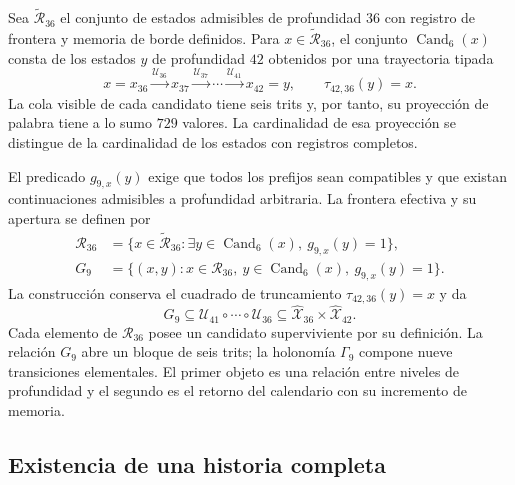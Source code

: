 Sea $\widetilde{\mathcal R}_{36}$ el conjunto de estados admisibles de
profundidad $36$ con registro de frontera y memoria de borde definidos.
Para $x\in\widetilde{\mathcal R}_{36}$, el conjunto
$\operatorname{Cand}_6(x)$ consta de los estados $y$ de profundidad
$42$ obtenidos por una trayectoria tipada
\[
 x=x_{36}\xrightarrow{\mathcal U_{36}}x_{37}
 \xrightarrow{\mathcal U_{37}}\cdots
 \xrightarrow{\mathcal U_{41}}x_{42}=y,
 \qquad \tau_{42,36}(y)=x.
\]
La cola visible de cada candidato tiene seis trits y, por tanto, su
proyección de palabra tiene a lo sumo $729$ valores. La cardinalidad de
esa proyección se distingue de la cardinalidad de los estados con
registros completos.

El predicado $g_{9,x}(y)$ exige que todos los prefijos sean compatibles
y que existan continuaciones admisibles a profundidad arbitraria. La
frontera efectiva y su apertura se definen por
\begin{align*}
 \mathcal R_{36}
 &=\{x\in\widetilde{\mathcal R}_{36}:
      \exists y\in\operatorname{Cand}_6(x),\ g_{9,x}(y)=1\},\\
 G_9&=\{(x,y):x\in\mathcal R_{36},\
                y\in\operatorname{Cand}_6(x),\ g_{9,x}(y)=1\}.
\end{align*}
La construcción conserva el cuadrado de truncamiento
$\tau_{42,36}(y)=x$ y da
\[
 G_9\subseteq\mathcal U_{41}\circ\cdots\circ\mathcal U_{36}
 \subseteq\widehat{\mathcal X}_{36}\times\widehat{\mathcal X}_{42}.
\]
Cada elemento de $\mathcal R_{36}$ posee un candidato superviviente por
su definición. La relación $G_9$ abre un bloque de seis trits; la
holonomía $\Gamma_9$ compone nueve transiciones elementales. El primer
objeto es una relación entre niveles de profundidad y el segundo es el
retorno del calendario con su incremento de memoria.

\subsection{Existencia de una historia completa}

